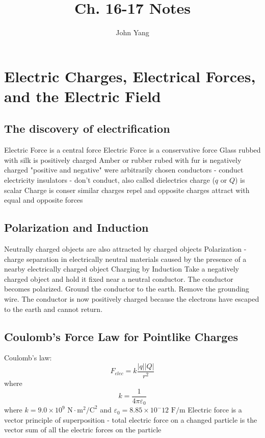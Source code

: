 \documentclass[twocolumn]{article}
\title{Ch. 16-17 Notes}
\author{John Yang}
\begin{document}
\maketitle
\section{Electric Charges, Electrical Forces, and the Electric Field}
\subsection{The discovery of electrification}
\begin{outline}
	\1 Electric Force is a central force
	\1 Electric Force is a conservative force
	\1 Glass rubbed with silk is positively charged
	\1 Amber or rubber rubed with fur is negatively charged
	\1 "positive and negative" were arbitrarily chosen
	\1 conductors - conduct electricity
	\1 insulators - don't conduct, also called dielectrics
	\1 charge ($q$ or $Q$) is scalar
	\1 Charge is conser
	\1 similar charges repel and opposite charges attract with equal and opposite forces
\end{outline}
\subsection{Polarization and Induction}
\begin{outline}
	\1 Neutrally charged objects are also attracted by charged objects
	\1 Polarization - charge separation in electrically neutral materials caused by the presence of a nearby electrically charged object
	\1 Charging by Induction
		\2 Take a negatively charged object and hold it fixed near a neutral conductor. The conductor becomes polarized. 
		\2 Ground the conductor to the earth. 
		\2 Remove the grounding wire. The conductor is now positively charged because the electrons have escaped to the earth and cannot return.

\end{outline}
\subsection{Coulomb's Force Law for Pointlike Charges}
\begin{outline}
	\1 Coulomb's law: \[F_{elec}=k\dfrac{|q||Q|}{r^2}\] where \[k=\dfrac{1}{4\pi\varepsilon_0}\] where \(k=9.0\times10^9 \text{ N}\cdot\text{m}^2\text{/C}^2\) and \(\varepsilon_0=8.85\times10^-12\text{ F/m}\)
	\1 Electric force is a vector
	\1 principle of superposition - total electric force on a changed particle is the vector sum of all the electric forces on the particle
\end{outline}
\end{document}
